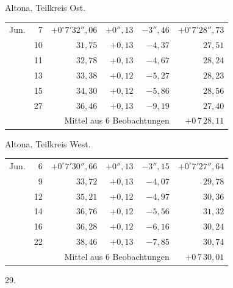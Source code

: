\noindent\begin{minipage}[t]{.495\textwidth}\centering Altona. Teilkreis Ost.\par\smallskip
{\scriptsize\setlength{\tabcolsep}{1pt}\renewcommand{\arraystretch}{1.2}\begin{tabular}{lr|r|r|r|r|}
Jun.&7&$+0^\circ7'32''{,}06$&$+0''{,}13$&$-3''{,}46$&$+0^\circ7'28''{,}73$\\
&10&$31{,}75$&$+0{,}13$&$-4{,}37$&$27{,}51$\\
&11&$32{,}78$&$+0{,}13$&$-4{,}67$&$28{,}24$\\
&13&$33{,}38$&$+0{,}12$&$-5{,}27$&$28{,}23$\\
&15&$34{,}30$&$+0{,}12$&$-5{,}86$&$28{,}56$\\
&27&$36{,}46$&$+0{,}13$&$-9{,}19$&$27{,}40$\\
\cline{6-6}\multicolumn{5}{r}{Mittel aus 6 Beobachtungen}&$+0\,7\,28{,}11$
\end{tabular}}\end{minipage}\hfill\begin{minipage}[t]{.495\textwidth}\centering Altona. Teilkreis West.\par\smallskip
{\scriptsize\setlength{\tabcolsep}{1pt}\renewcommand{\arraystretch}{1.2}\begin{tabular}{lr|r|r|r|r}
Jun.&6&$+0^\circ7'30''{,}66$&$+0''{,}13$&$-3''{,}15$&$+0^\circ7'27''{,}64$\\
&9&$33{,}72$&$+0{,}13$&$-4{,}07$&$29{,}78$\\
&12&$35{,}21$&$+0{,}12$&$-4{,}97$&$30{,}36$\\
&14&$36{,}76$&$+0{,}12$&$-5{,}56$&$31{,}32$\\
&16&$36{,}28$&$+0{,}12$&$-6{,}16$&$30{,}24$\\
&22&$38{,}46$&$+0{,}13$&$-7{,}85$&$30{,}74$\\
\cline{6-6}\multicolumn{5}{r}{Mittel aus 6 Beobachtungen}&$+0\,7\,30{,}01$
\end{tabular}}\end{minipage}
\par\vspace{4mm}
\begin{center}29.\end{center}

